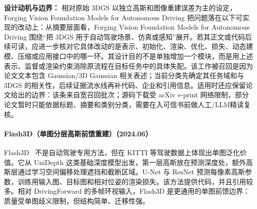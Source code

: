 \textbf{设计动机与边界：} 相对原始 3DGS 以独立高斯和图像重建误差为主的设定，Forging Vision Foundation Models for Autonomous Driving 把问题落在以下可实现的改动上：从摘要层面看，Forging Vision Foundation Models for Autonomous Driving 围绕“把 3DGS 用于自动驾驶场景、仿真或感知”展开。若其正文或代码后续可读，应进一步核对它具体改动的是表示、初始化、渲染、优化、损失、动态建模、压缩或应用接口中的哪一环。其设计目的不是单独增加一个模块，而是用上述表示、监督或渲染约束消除原流程在目标任务中的具体失配。该工作被召回是因为论文文本包含 Gaussian/3D Gaussian 相关表述；当前分类先确定其任务域和与 3DGS 的相关性，后续证据流水线再补代码、企业和引用信息。适用时还应保留论文给出的边界：该条来自宽召回批次；源码下载受 arXiv e-print 网络限制，部分论文暂时只能依据标题、摘要和类别分类，需要在入可信书前做人工/LLM精读复核。
\paragraph{Flash3D（单图分层高斯前馈重建）（2024.06）}
Flash3D~\cite{2406_04343} 不是自动驾驶专用方法，但在 KITTI 等驾驶数据上体现出单图泛化价值。它从 UniDepth 这类基础深度模型出发，第一层高斯放在预测深度处，额外高斯层通过学习空间偏移处理遮挡和截断区域。U-Net 与 ResNet 预测每像素高斯参数，训练用输入图、目标图和相对位姿的渲染损失。该方法提供代码，并且引用较多。相对 DrivingForward 的多帧环视输入，Flash3D 是更通用的单图前馈边界：质量受单图歧义限制，但结构简单、迁移性强。

